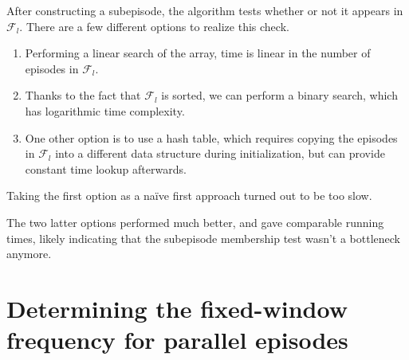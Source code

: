 After constructing a subepisode, the algorithm tests whether or not it appears in $ \mathcal{F}_l $. There are a few different options to realize this check.

\begin{enumerate}
\item Performing a linear search of the array, time is linear in the number of episodes in $ \mathcal{F}_l $.
\item Thanks to the fact that $ \mathcal{F}_l $ is sorted, we can perform a binary search, which has logarithmic time complexity.
\item One other option is to use a hash table, which requires copying the episodes in $ \mathcal{F}_l $ into a different data structure during initialization, but can provide constant time lookup afterwards.
\end{enumerate}

Taking the first option as a naïve first approach turned out to be too slow.

The two latter options performed much better, and gave comparable running times, likely indicating that the subepisode membership test wasn't a bottleneck anymore.


\section{Determining the fixed-window frequency for parallel episodes}

